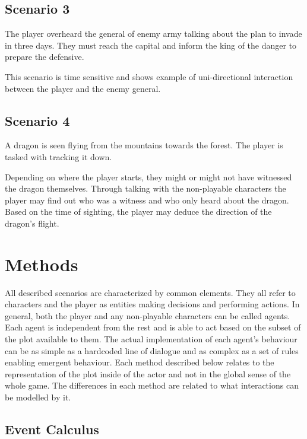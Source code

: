 \subsection{Scenario 3}

The player overheard the general of enemy army talking about the plan to invade in three days.
They must reach the capital and inform the king of the danger to prepare the defensive.

This scenario is time sensitive and shows example of uni-directional interaction between the player and the enemy general.

\subsection{Scenario 4}

A dragon is seen flying from the mountains towards the forest.
The player is tasked with tracking it down.

Depending on where the player starts, they might or might not have witnessed the dragon themselves.
Through talking with the non-playable characters the player may find out who was a witness and who only heard about the dragon.
Based on the time of sighting, the player may deduce the direction of the dragon's flight.


\section{Methods}

All described scenarios are characterized by common elements.
They all refer to characters and the player as entities making decisions and performing actions.
In general, both the player and any non-playable characters can be called agents.
Each agent is independent from the rest and is able to act based on the subset of the plot available to them.
The actual implementation of each agent's behaviour can be as simple as a hardcoded line of dialogue and as complex as a set of rules enabling emergent behaviour.
Each method described below relates to the representation of the plot inside of the actor and not in the global sense of the whole game.
The differences in each method are related to what interactions can be modelled by it.

\subsection{Event Calculus}

